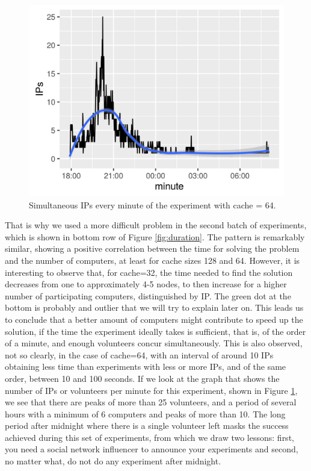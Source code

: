 \documentclass[letterpaper]{article}
\begin{document}
\begin{figure}[!htb]
\centering
\includegraphics[width=0.95\linewidth]{ips-per-minute-cache=64.png}
\caption{Simultaneous IPs every minute of the experiment with cache =
  64. \label{fig:otisdriftwood}}
\end{figure}


That is why we used a more difficult problem in the second batch of
experiments, which is shown in bottom row of Figure
\ref{fig:duration}. The pattern is remarkably similar, showing a
positive correlation between the time for solving the problem and the
number of computers, at least for cache sizes 128 and 64. However, it
is interesting to observe that, for cache=32, the time needed to find
the solution decreases from one to approximately 4-5 nodes, to then
increase for a higher number of participating computers, distinguished
by IP. The green dot at the bottom is probably and outlier that we
will try to explain later on. This leads us to conclude that a better
amount of computers might contribute to speed up the solution, if the
time the experiment ideally takes is sufficient, that is, of the order of a
minute, and enough volunteers concur simultaneously. This is also
observed, not so clearly, in the case of cache=64, with an interval of
around 10 IPs obtaining less time than experiments with less or more
IPs, and of the same order, between 10 and 100 seconds. If we look at
the graph that shows the number of IPs or volunteers per minute for
this experiment, shown in Figure \ref{fig:otisdriftwood}, we see that
there are peaks of more than 25 volunteers, and a period of several
hours with a minimum of 6 computers and peaks of more than 10. The
long period after midnight where there is a single volunteer left
masks the success achieved during this set of experiments, from which
we draw two lessons: first, you need a social network influencer to
announce your experiments and second, no matter what, do not do any
experiment after midnight. 
\end{document}
